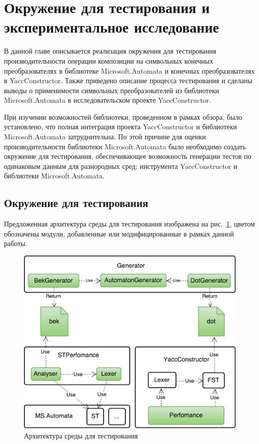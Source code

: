 \section{Окружение для тестирования и экспериментальное исследование}
В данной главе описывается реализация окружения для тестирования производительности операции композиции на символьных конечных преобразователях в библиотеке Microsoft.Automata и конечных преобразователях в YaccConstructor. Также приведено описание процесса тестирования и сделаны выводы о применимости символьных преобразователей из библиотеки Microsoft.Automata в исследовательском проекте YaccConstructor.

При изучении возможностей библиотеки, проведенном в рамках обзора, было установлено, что полная интеграция проекта YaccConstructor  и библиотеки Microsoft.Automata затруднительна. По этой причине для оценки производительности библиотеки Microsoft.Automata было необходимо создать окружение для тестирования, обеспечивающее возможность генерации тестов по одинаковым данным для разнородных сред: инструмента YaccConstructor и библиотеки Microsoft.Automata.

\subsection{Окружение для тестирования}
Предложенная архитектура среды для тестирования изображена на рис.~\ref{fig:toolStructure}, цветом обозначены модули, добавленные или модифицированные в рамках данной работы. 
\begin{figure}[h!]
    \begin{center}
        \includegraphics[width=\linewidth]{Gumin/pictures/YC.pdf}
        \caption{Архитектура среды для тестирования}
        \label{fig:toolStructure} 
    \end{center}
\end{figure}

